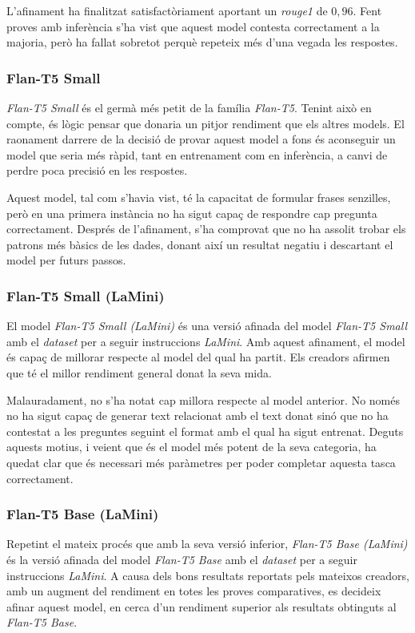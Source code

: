 L'afinament ha finalitzat satisfactòriament aportant un \textit{rouge1} de $0,96$. Fent proves amb inferència s'ha vist que aquest model contesta correctament a la majoria, però ha fallat sobretot perquè repeteix més d'una vegada les respostes.

\subsubsection{Flan-T5 Small}
\textit{Flan-T5 Small} \cite{flan-t5} és el germà més petit de la família \textit{Flan-T5}. Tenint això en compte, és lògic pensar que donaria un pitjor rendiment que els altres models. El raonament darrere de la decisió de provar aquest model a fons és aconseguir un model que seria més ràpid, tant en entrenament com en inferència, a canvi de perdre poca precisió en les respostes.

Aquest model, tal com s'havia vist, té la capacitat de formular frases senzilles, però en una primera instància no ha sigut capaç de respondre cap pregunta correctament. Després de l'afinament, s'ha comprovat que no ha assolit trobar els patrons més bàsics de les dades, donant així un resultat negatiu i descartant el model per futurs passos.

\subsubsection{Flan-T5 Small (LaMini)}
El model \textit{Flan-T5 Small (LaMini)} \cite{flan-t5} \cite{lamini} és una versió afinada del model \textit{Flan-T5 Small} amb el \textit{dataset} per a seguir instruccions \textit{LaMini}. Amb aquest afinament, el model és capaç de millorar respecte al model del qual ha partit. Els creadors afirmen que té el millor rendiment general donat la seva mida.

Malauradament, no s'ha notat cap millora respecte al model anterior. No només no ha sigut capaç de generar text relacionat amb el text donat sinó que no ha contestat a les preguntes seguint el format amb el qual ha sigut entrenat. Deguts aquests motius, i veient que és el model més potent de la seva categoria, ha quedat clar que és necessari més paràmetres per poder completar aquesta tasca correctament.

\subsubsection{Flan-T5 Base (LaMini)}
Repetint el mateix procés que amb la seva versió inferior, \textit{Flan-T5 Base (LaMini)} \cite{flan-t5} \cite{lamini} és la versió afinada del model \textit{Flan-T5 Base} amb el \textit{dataset} per a seguir instruccions \textit{LaMini}. A causa dels bons resultats reportats pels mateixos creadors, amb un augment del rendiment en totes les proves comparatives, es decideix afinar aquest model, en cerca d'un rendiment superior als resultats obtinguts al \textit{Flan-T5 Base}.


